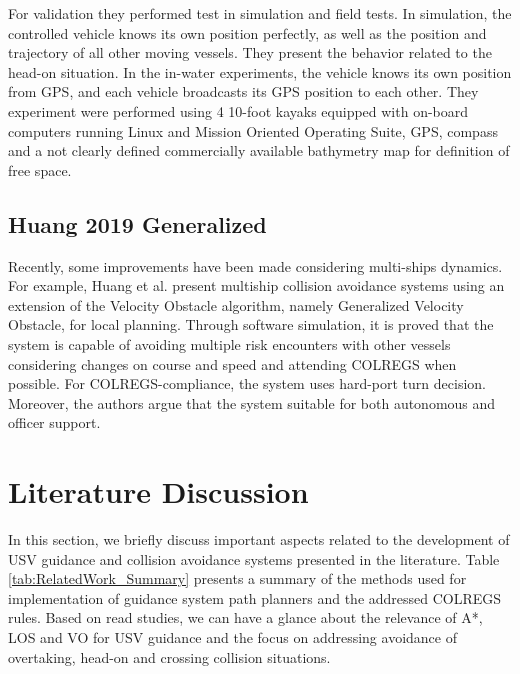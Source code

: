     For validation they performed test in simulation and field tests. In simulation, the controlled vehicle knows its own position perfectly, as well as the position and trajectory of all other moving vessels. They present the behavior related to the head-on situation. In the in-water experiments, the vehicle knows its own position from GPS, and each vehicle broadcasts its GPS position to each other. They experiment were performed using 4 10-foot kayaks equipped with on-board computers running Linux and Mission Oriented Operating Suite\cite{MOOS}, GPS, compass and a not clearly defined commercially available bathymetry map for definition of free space.
    
    \subsection{Huang 2019 Generalized}
    Recently, some improvements have been made considering multi-ships dynamics. For example, Huang et al. present multiship collision avoidance systems using an extension of the Velocity Obstacle algorithm, namely Generalized Velocity Obstacle, for local planning. Through software simulation, it is proved that the system is capable of avoiding multiple risk encounters with other vessels considering changes on course and speed and attending COLREGS when possible. For COLREGS-compliance, the system uses hard-port turn decision. Moreover, the authors argue that the system suitable for both autonomous and officer support.
    
    \section{Literature Discussion}
    
    In this section, we briefly discuss important aspects related to the development of \ac{USV} guidance and collision avoidance systems presented in the literature. Table \ref{tab:RelatedWork_Summary} presents a summary of the methods used for implementation of guidance system path planners and the addressed \ac{COLREGS} rules. Based on read studies, we can have a glance about the relevance of A*, \ac{LOS} and \ac{VO} for \ac{USV} guidance and the focus on addressing avoidance of overtaking, head-on and crossing collision situations.
    
